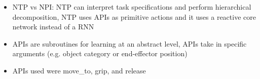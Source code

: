 \begin{itemize}
\begin{figure}[H]
  \end{figure}
  \item NTP vs NPI: NTP can interpret task specifications and perform hierarchical decomposition, NTP uses APIs as primitive actions and it uses a reactive core network instead of a RNN
  \item APIs are subroutines for learning at an abstract level, APIs take in specific arguments (e.g. object category or end-effector position)
  \item APIs used were move\_to, grip, and release
\end{itemize}